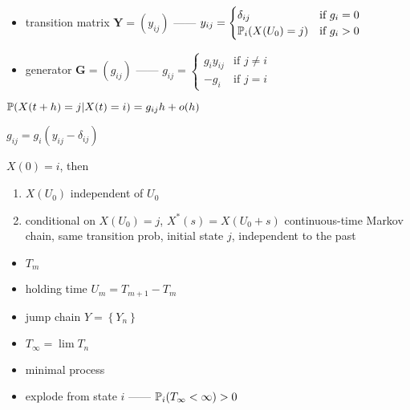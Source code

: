 \begin{itemize}
    \item transition matrix $\textbf{Y} = (y_{ij})$ ------ $y_{ij} = \begin{cases}
                                                                \delta_{ij} & \text{if } g_i = 0\\
                                                                \mathbb{P}_i(X(U_0) = j) & \text{if } g_i > 0
    \end{cases}$
    \item generator $\textbf{G} = (g_{ij})$ ------ $g_{ij} = \begin{cases}
                                                        g_{i} y_{ij} &\text{if } j \neq i\\
                                                        -g_i & \text{if } j = i
    \end{cases}$
\end{itemize}

\begin{fact}
    $\mathbb{P}(X(t+h) = j |X(t) = i) = g_{ij}h + o(h)$
\end{fact}

\begin{fact}
    $g_{ij} = g_i(y_{ij} - \delta_{ij})$
\end{fact}

\begin{thm}
    $X(0) = i$, then
    \begin{enumerate}
        \item $X(U_0)$ independent of $U_0$
        \item conditional on $X(U_0) = j$, $X^*(s) = X(U_0 + s)$ continuous-time Markov chain, same transition prob, initial state $j$, independent to the past
    \end{enumerate}
\end{thm}

\begin{itemize}
    \item $T_m$
    \item holding time $U_m = T_{m + 1} - T_m$
    \item jump chain $Y = \left\{ Y_n \right\}$
    \item $T_{\infty} = \lim T_n$
    \item minimal process
    \item explode from state $i$ ------ $\mathbb{P}_i(T_\infty < \infty) > 0$
\end{itemize}

